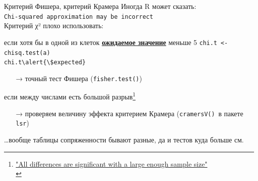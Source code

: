 \begin{frame}{Критерий Фишера, критерий Крамера}
Иногда R может сказать:\\
\scriptsize\verb"Chi-squared approximation may be incorrect"\\ \normalsize
\vfill
Критерий χ² плохо использовать:
\begin{itemize}
\mytem если хотя бы в одной из клеток \textbf{\underline{ожидаемое значение}} меньше 5
\scriptsize\verb"chi.t <- chisq.test(a)"\normalsize\\
\scriptsize\verb"chi.t\alert{\$expected}"\normalsize
\begin{itemize}
\item[→] точный тест Фишера (\scriptsize\verb"fisher.test()"\normalsize)
\end{itemize}
\mytem если между числами есть большой разрыв\footnote[frame]{\href{http://stats.stackexchange.com/a/108914}{\alert{ "All differences are significant with a large enough sample size"}\\}}
\begin{itemize}
\item[→] проверяем величину эффекта критерием Крамера (\scriptsize\verb"cramersV()"\normalsize\ в пакете \scriptsize\verb"lsr"\normalsize)
\end{itemize}
\mytem \dots вообще таблицы сопряженности бывают разные, да и тестов куда больше см.~\citep{lydersen09}
\end{itemize}
\end{frame}
